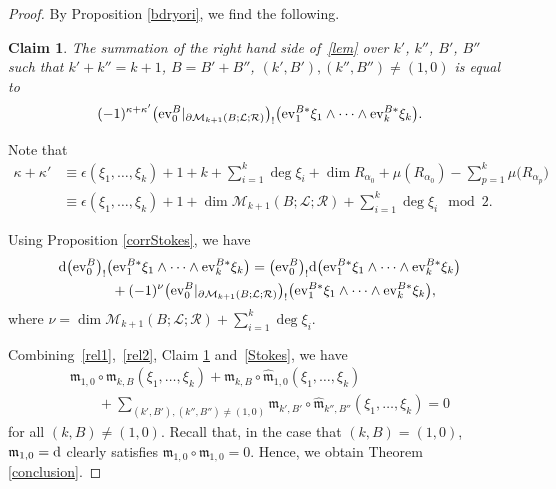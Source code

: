 \documentclass[pdftex]{sigma}
\numberwithin{equation}{section}
\newtheorem{clm}[thm]{Claim}
\theoremstyle{definition}
\begin{document}
\begin{proof}
By Proposition \ref{bdryori}, we find the following.

\begin{clm}\label{rel3}
The summation of the right hand side of~\eqref{lem} over $k'$, $k''$, $B'$, $B''$ such that
${k' + k'' = k+1}$, $B=B' + B''$, $(k', B'), (k'', B'') \neq (1,0)$ is equal to
\[ (-1)^{\kappa + \kappa'} \bigl({\rm ev}^B_0\vert_{\partial {\mathcal M}_{k+1}(B;{\mathcal L}; {\mathcal R})}\bigr)_! \bigl({\rm ev}_1^{B*}\xi_1 \wedge \dots\wedge {\rm ev}_k^{B*} \xi_k\bigr).\]
\end{clm}

Note that
\begin{align*}
\kappa + \kappa' &{} \equiv \epsilon(\xi_1 ,\dots, \xi_k) + 1 + k + \sum_{i=1}^k \deg \xi_i + \dim R_{\alpha_0} + \mu(R_{\alpha_0}) - \sum_{p=1}^k
\mu\bigl(R_{\alpha_p}\bigr)  \\
&{} \equiv \epsilon(\xi_1 ,\dots, \xi_k) + 1 + \dim {\mathcal M}_{k+1}(B;{\mathcal L};{\mathcal R}) + \sum_{i=1}^k \deg \xi_i \mod 2 .
\end{align*}

Using Proposition \ref{corrStokes}, we have
\begin{gather}
{\rm d} \bigl({\rm ev}_0^B\bigr)_!\bigl({\rm ev}_1^{B*}\xi_1 \wedge \dots \wedge {\rm ev}_k^{B*}\xi_k\bigr)  =  \bigl({\rm ev}_0^B\bigr)_! {\rm d}\bigl({\rm ev}_1^{B*}\xi_1 \wedge \dots \wedge {\rm ev}_k^{B*} \xi_k\bigr) \nonumber \\
\qquad{} + (-1)^\nu \bigl({\rm ev}_0^B\vert_{\partial {\mathcal M}_{k+1}(B;{\mathcal L};{\mathcal R})}\bigr)_!
\bigl({\rm ev}_1^{B*} \xi_1 \wedge \dots \wedge {\rm ev}_k^{B*}\xi_k\bigr),\label{Stokes}
\end{gather}
where $\nu = \dim {\mathcal M}_{k+1}(B;{\mathcal L};{\mathcal R}) + \sum_{i=1}^k \deg \xi_i.$

Combining~\eqref{rel1},~\eqref{rel2}, Claim \ref{rel3} and~\eqref{Stokes}, we have
\begin{gather*}
 {\mathfrak m}_{1,0} \circ {\mathfrak m}_{k, B} (\xi_1, \dots, \xi_k) + {\mathfrak m}_{k,B} \circ \hat{\mathfrak m}_{1,0} (\xi_1, \dots, \xi_k)  \\
\qquad{} + \sum_{(k',B'), (k'', B'') \neq (1,0)} {\mathfrak m}_{k',B'} \circ \hat{\mathfrak m}_{k'',B''} (\xi_1, \dots, \xi_k) = 0
\end{gather*}
for all $(k,B) \neq (1,0)$.
Recall that, in the case that $(k, B) = (1,0)$, ${\mathfrak m}_{1,0}= {\rm d}$ clearly satisfies ${\mathfrak m}_{1,0} \circ {\mathfrak m}_{1,0} = 0$.
Hence, we obtain Theorem \ref{conclusion}.
\end{proof}
\end{document}
